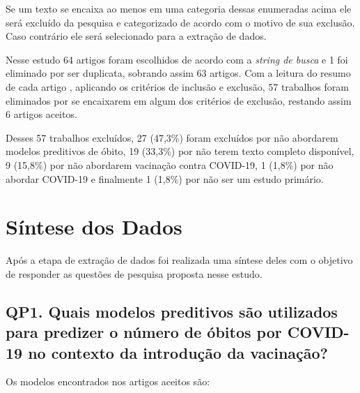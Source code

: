 Se um texto se encaixa ao menos em uma categoria dessas enumeradas acima ele será excluído da pesquisa e categorizado de acordo com o motivo de sua exclusão. Caso contrário ele será selecionado para a extração de dados.

Nesse estudo 64 artigos foram escolhidos de acordo com a \textit{string de busca} e 1 foi eliminado por ser duplicata, sobrando assim 63 artigos. Com a leitura do resumo de cada artigo , aplicando os critérios de inclusão e exclusão, 57 trabalhos foram eliminados por se encaixarem em algum dos critérios de exclusão, restando assim 6 artigos aceitos.

Desses 57 trabalhos excluídos, 27 (47,3\%) foram excluídos por não abordarem modelos preditivos de óbito, 19 (33,3\%) por não terem texto completo disponível, 9 (15,8\%) por não abordarem vacinação contra COVID-19, 1 (1,8\%) por não abordar COVID-19 e finalmente 1 (1,8\%) por não ser um estudo primário.

\section{Síntese dos Dados}

Após a etapa de extração de dados foi realizada uma síntese deles com o objetivo de responder as questões de pesquisa proposta nesse estudo.

\subsection{QP1. Quais modelos preditivos são utilizados para predizer o número de óbitos por COVID-19 no contexto da introdução da vacinação?}

Os modelos encontrados nos artigos aceitos são:

